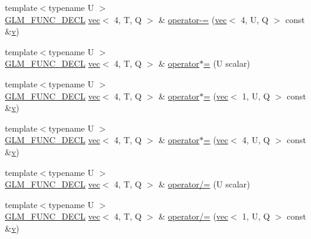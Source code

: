 \begin{DoxyCompactItemize}
\item 
{\footnotesize template$<$typename U $>$ }\\\hyperlink{setup_8hpp_ab2d052de21a70539923e9bcbf6e83a51}{G\+L\+M\+\_\+\+F\+U\+N\+C\+\_\+\+D\+E\+CL} \hyperlink{structglm_1_1vec}{vec}$<$ 4, T, Q $>$ \& \hyperlink{structglm_1_1vec_3_014_00_01_t_00_01_q_01_4_a6c7121aa85c158912c509760cf65da75}{operator-\/=} (\hyperlink{structglm_1_1vec}{vec}$<$ 4, U, Q $>$ const \&\hyperlink{_s_d_l__opengl_8h_a10a82eabcb59d2fcd74acee063775f90}{v})
\item 
{\footnotesize template$<$typename U $>$ }\\\hyperlink{setup_8hpp_ab2d052de21a70539923e9bcbf6e83a51}{G\+L\+M\+\_\+\+F\+U\+N\+C\+\_\+\+D\+E\+CL} \hyperlink{structglm_1_1vec}{vec}$<$ 4, T, Q $>$ \& \hyperlink{structglm_1_1vec_3_014_00_01_t_00_01_q_01_4_a084756852ac777dca065e256f72aa75f}{operator$\ast$=} (U scalar)
\item 
{\footnotesize template$<$typename U $>$ }\\\hyperlink{setup_8hpp_ab2d052de21a70539923e9bcbf6e83a51}{G\+L\+M\+\_\+\+F\+U\+N\+C\+\_\+\+D\+E\+CL} \hyperlink{structglm_1_1vec}{vec}$<$ 4, T, Q $>$ \& \hyperlink{structglm_1_1vec_3_014_00_01_t_00_01_q_01_4_a4b89052935e5383d7b04478b91a25823}{operator$\ast$=} (\hyperlink{structglm_1_1vec}{vec}$<$ 1, U, Q $>$ const \&\hyperlink{_s_d_l__opengl_8h_a10a82eabcb59d2fcd74acee063775f90}{v})
\item 
{\footnotesize template$<$typename U $>$ }\\\hyperlink{setup_8hpp_ab2d052de21a70539923e9bcbf6e83a51}{G\+L\+M\+\_\+\+F\+U\+N\+C\+\_\+\+D\+E\+CL} \hyperlink{structglm_1_1vec}{vec}$<$ 4, T, Q $>$ \& \hyperlink{structglm_1_1vec_3_014_00_01_t_00_01_q_01_4_a27ac62ee4c5d423e772c40d015ee54da}{operator$\ast$=} (\hyperlink{structglm_1_1vec}{vec}$<$ 4, U, Q $>$ const \&\hyperlink{_s_d_l__opengl_8h_a10a82eabcb59d2fcd74acee063775f90}{v})
\item 
{\footnotesize template$<$typename U $>$ }\\\hyperlink{setup_8hpp_ab2d052de21a70539923e9bcbf6e83a51}{G\+L\+M\+\_\+\+F\+U\+N\+C\+\_\+\+D\+E\+CL} \hyperlink{structglm_1_1vec}{vec}$<$ 4, T, Q $>$ \& \hyperlink{structglm_1_1vec_3_014_00_01_t_00_01_q_01_4_a986552cf3068f2573edbcc4f203f1902}{operator/=} (U scalar)
\item 
{\footnotesize template$<$typename U $>$ }\\\hyperlink{setup_8hpp_ab2d052de21a70539923e9bcbf6e83a51}{G\+L\+M\+\_\+\+F\+U\+N\+C\+\_\+\+D\+E\+CL} \hyperlink{structglm_1_1vec}{vec}$<$ 4, T, Q $>$ \& \hyperlink{structglm_1_1vec_3_014_00_01_t_00_01_q_01_4_aa1b32778dee89d5111b478d6c95a654d}{operator/=} (\hyperlink{structglm_1_1vec}{vec}$<$ 1, U, Q $>$ const \&\hyperlink{_s_d_l__opengl_8h_a10a82eabcb59d2fcd74acee063775f90}{v})

\end{DoxyCompactItemize}
